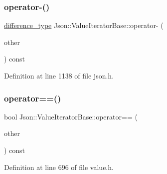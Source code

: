\subsubsection{\texorpdfstring{operator-\/()}{operator-()}\hspace{0.1cm}{\footnotesize\ttfamily [2/2]}}
{\footnotesize\ttfamily \hyperlink{class_json_1_1_value_iterator_base_a4e44bf8cbd17ec8d6e2c185904a15ebd}{difference\+\_\+type} Json\+::\+Value\+Iterator\+Base\+::operator-\/ (\begin{DoxyParamCaption}\item[{const \hyperlink{class_json_1_1_value_iterator_base_a9d2a940d03ea06d20d972f41a89149ee}{Self\+Type} \&}]{other }\end{DoxyParamCaption}) const\hspace{0.3cm}{\ttfamily [inline]}}



Definition at line 1138 of file json.\+h.

\hypertarget{class_json_1_1_value_iterator_base_a1248d8016f88b51371a0fcbd355b3cfd}{}\label{class_json_1_1_value_iterator_base_a1248d8016f88b51371a0fcbd355b3cfd} 
\subsubsection{\texorpdfstring{operator==()}{operator==()}\hspace{0.1cm}{\footnotesize\ttfamily [1/2]}}
{\footnotesize\ttfamily bool Json\+::\+Value\+Iterator\+Base\+::operator== (\begin{DoxyParamCaption}\item[{const \hyperlink{class_json_1_1_value_iterator_base_a9d2a940d03ea06d20d972f41a89149ee}{Self\+Type} \&}]{other }\end{DoxyParamCaption}) const\hspace{0.3cm}{\ttfamily [inline]}}



Definition at line 696 of file value.\+h.

\hypertarget{class_json_1_1_value_iterator_base_a1248d8016f88b51371a0fcbd355b3cfd}{}\label{class_json_1_1_value_iterator_base_a1248d8016f88b51371a0fcbd355b3cfd} 
